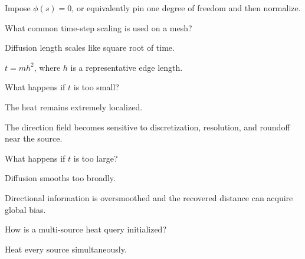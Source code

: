 \begin{solution}
Impose \(\phi(s)=0\), or equivalently pin one degree of freedom and then normalize.
\end{solution}

\begin{exercise}\label{exr:vii40-15}
What common time-step scaling is used on a mesh?
\end{exercise}

\begin{hint}
Diffusion length scales like square root of time.
\end{hint}

\begin{solution}
\(t=m h^2\), where \(h\) is a representative edge length.
\end{solution}

\begin{exercise}\label{exr:vii40-16}
What happens if \(t\) is too small?
\end{exercise}

\begin{hint}
The heat remains extremely localized.
\end{hint}

\begin{solution}
The direction field becomes sensitive to discretization, resolution, and roundoff near the source.
\end{solution}

\begin{exercise}\label{exr:vii40-17}
What happens if \(t\) is too large?
\end{exercise}

\begin{hint}
Diffusion smooths too broadly.
\end{hint}

\begin{solution}
Directional information is oversmoothed and the recovered distance can acquire global bias.
\end{solution}

\begin{exercise}\label{exr:vii40-18}
How is a multi-source heat query initialized?
\end{exercise}

\begin{hint}
Heat every source simultaneously.
\end{hint}

